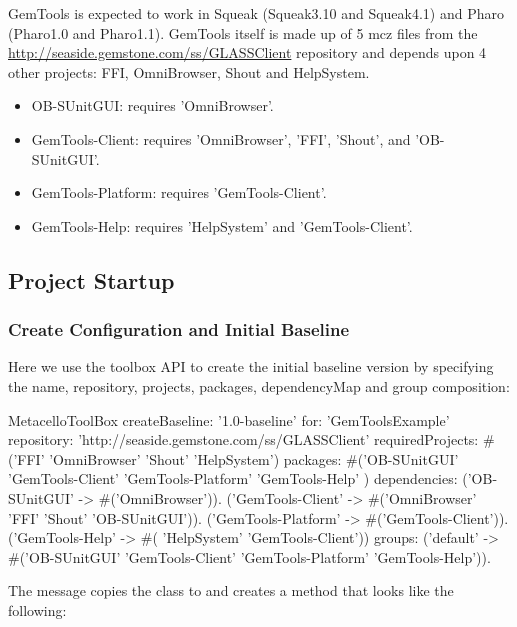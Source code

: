 \documentclass[a4paper,10pt,twoside]{book}
\begin{document}
GemTools is expected to work in Squeak (Squeak3.10 and Squeak4.1) and Pharo (Pharo1.0 and Pharo1.1). GemTools itself is made up of 5 mcz files from the \url{http://seaside.gemstone.com/ss/GLASSClient} repository and  depends upon 4 other projects: FFI, OmniBrowser, Shout and HelpSystem. 
\begin{itemize}
\item OB-SUnitGUI: requires 'OmniBrowser'. 
\item GemTools-Client: requires 'OmniBrowser', 'FFI', 'Shout', and 'OB-SUnitGUI'. 
\item GemTools-Platform: requires 'GemTools-Client'. 
\item GemTools-Help: requires 'HelpSystem' and 'GemTools-Client'. 
\end{itemize}


\subsection{Project Startup}

\subsubsection{Create Configuration and Initial Baseline}
Here we use the toolbox API to create the initial baseline version by specifying the name, repository, projects, packages, dependencyMap and group composition:

\begin{code}{}
  MetacelloToolBox
     createBaseline: '1.0-baseline'
     for: 'GemToolsExample'
     repository: 'http://seaside.gemstone.com/ss/GLASSClient'
     requiredProjects: #('FFI' 'OmniBrowser' 'Shout' 'HelpSystem')
     packages: #('OB-SUnitGUI' 'GemTools-Client' 'GemTools-Platform' 'GemTools-Help' )
     dependencies:
        {('OB-SUnitGUI' -> #('OmniBrowser')).
        ('GemTools-Client' -> #('OmniBrowser' 'FFI' 'Shout' 'OB-SUnitGUI')).
        ('GemTools-Platform' -> #('GemTools-Client')).
        ('GemTools-Help' -> #( 'HelpSystem' 'GemTools-Client'))}
     groups:
        {('default' -> #('OB-SUnitGUI' 'GemTools-Client' 'GemTools-Platform' 'GemTools-Help'))}.
\end{code}                
                
The  message copies the class  to  and creates a  method that looks like the following:
\end{document}
